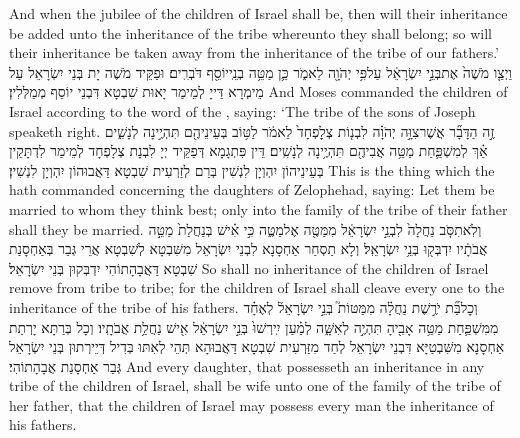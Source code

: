{And when the jubilee of the children of Israel shall be, then will their inheritance be added unto the inheritance of the tribe whereunto they shall belong; so will their inheritance be taken away from the inheritance of the tribe of our fathers.’}{}
{וַיְצַ֤ו מֹשֶׁה֙ אֶת\maqqaf בְּנֵ֣י יִשְׂרָאֵ֔ל עַל\maqqaf פִּ֥י יְהֹוָ֖ה לֵאמֹ֑ר כֵּ֛ן מַטֵּ֥ה בְנֵֽי\maqqaf יוֹסֵ֖ף דֹּבְרִֽים׃}
{וּפַקֵּיד מֹשֶׁה יָת בְּנֵי יִשְׂרָאֵל עַל מֵימְרָא דַּייָ לְמֵימַר יָאוּת שִׁבְטָא דִּבְנֵי יוֹסֵף מְמַלְּלִין׃}
{And Moses commanded the children of Israel according to the word of the \lord, saying: ‘The tribe of the sons of Joseph speaketh right.}{}
{זֶ֣ה הַדָּבָ֞ר אֲשֶׁר\maqqaf צִוָּ֣ה יְהֹוָ֗ה לִבְנ֤וֹת צְלׇפְחָד֙ לֵאמֹ֔ר לַטּ֥וֹב בְּעֵינֵיהֶ֖ם תִּהְיֶ֣ינָה לְנָשִׁ֑ים אַ֗ךְ לְמִשְׁפַּ֛חַת מַטֵּ֥ה אֲבִיהֶ֖ם תִּהְיֶ֥ינָה לְנָשִֽׁים׃}
{דֵּין פִּתְגָמָא דְּפַקֵּיד יְיָ לִבְנָת צְלָפְחָד לְמֵימַר לִדְתָּקֵין בְּעֵינֵיהוֹן יִהְוְיָן לִנְשִׁין בְּרַם לְזַרְעִית שִׁבְטָא דַּאֲבוּהוֹן יִהְוְיָן לִנְשִׁין׃}
{This is the thing which the \lord\space hath commanded concerning the daughters of Zelophehad, saying: Let them be married to whom they think best; only into the family of the tribe of their father shall they be married.}{}
{וְלֹֽא\maqqaf תִסֹּ֤ב נַחֲלָה֙ לִבְנֵ֣י יִשְׂרָאֵ֔ל מִמַּטֶּ֖ה אֶל\maqqaf מַטֶּ֑ה כִּ֣י אִ֗ישׁ בְּנַחֲלַת֙ מַטֵּ֣ה אֲבֹתָ֔יו יִדְבְּק֖וּ בְּנֵ֥י יִשְׂרָאֵֽל׃}
{וְלָא תַסְחַר אַחְסָנָא לִבְנֵי יִשְׂרָאֵל מִשִּׁבְטָא לְשִׁבְטָא אֲרֵי גְּבַר בְּאַחְסָנַת שִׁבְטָא דַּאֲבָהָתוֹהִי יִדְבְּקוּן בְּנֵי יִשְׂרָאֵל׃}
{So shall no inheritance of the children of Israel remove from tribe to tribe; for the children of Israel shall cleave every one to the inheritance of the tribe of his fathers.}{}
{וְכׇל\maqqaf בַּ֞ת יֹרֶ֣שֶׁת נַחֲלָ֗ה מִמַּטּוֹת֮ בְּנֵ֣י יִשְׂרָאֵל֒ לְאֶחָ֗ד מִמִּשְׁפַּ֛חַת מַטֵּ֥ה אָבִ֖יהָ תִּהְיֶ֣ה לְאִשָּׁ֑ה לְמַ֗עַן יִֽירְשׁוּ֙ בְּנֵ֣י יִשְׂרָאֵ֔ל אִ֖ישׁ נַחֲלַ֥ת אֲבֹתָֽיו׃}
{וְכָל בְּרַתָּא יָרְתַת אַחְסָנָא מִשִּׁבְטַיָּא דִּבְנֵי יִשְׂרָאֵל לְחַד מִזַּרְעִית שִׁבְטָא דַּאֲבוּהָא תְּהֵי לְאִתּוּ בְּדִיל דְּיֵירְתוּן בְּנֵי יִשְׂרָאֵל גְּבַר אַחְסָנַת אֲבָהָתוֹהִי׃}
{And every daughter, that possesseth an inheritance in any tribe of the children of Israel, shall be wife unto one of the family of the tribe of her father, that the children of Israel may possess every man the inheritance of his fathers.}{}
